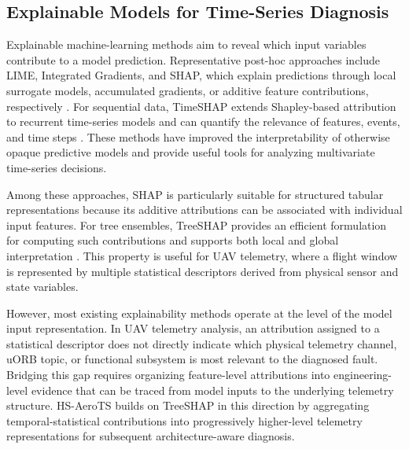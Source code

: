 \subsection{Explainable Models for Time-Series Diagnosis}

Explainable machine-learning methods aim to reveal which input variables contribute to a model prediction. Representative post-hoc approaches include LIME, Integrated Gradients, and SHAP, which explain predictions through local surrogate models, accumulated gradients, or additive feature contributions, respectively \cite{ribeiro2016lime,sundararajan2017axiomatic,lundberg2017shap}. For sequential data, TimeSHAP extends Shapley-based attribution to recurrent time-series models and can quantify the relevance of features, events, and time steps \cite{bento2021timeshap}. These methods have improved the interpretability of otherwise opaque predictive models and provide useful tools for analyzing multivariate time-series decisions.

Among these approaches, SHAP is particularly suitable for structured tabular representations because its additive attributions can be associated with individual input features. For tree ensembles, TreeSHAP provides an efficient formulation for computing such contributions and supports both local and global interpretation \cite{lundberg2017shap,lundberg2020trees}. This property is useful for UAV telemetry, where a flight window is represented by multiple statistical descriptors derived from physical sensor and state variables.

However, most existing explainability methods operate at the level of the model input representation. In UAV telemetry analysis, an attribution assigned to a statistical descriptor does not directly indicate which physical telemetry channel, uORB topic, or functional subsystem is most relevant to the diagnosed fault. Bridging this gap requires organizing feature-level attributions into engineering-level evidence that can be traced from model inputs to the underlying telemetry structure. HS-AeroTS builds on TreeSHAP in this direction by aggregating temporal-statistical contributions into progressively higher-level telemetry representations for subsequent architecture-aware diagnosis.
